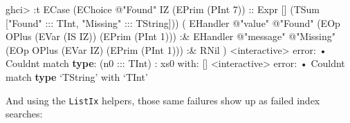 \documentclass[]{article}
\newenvironment{Shaded}{}{}
\newcommand{\DataTypeTok}[1]{\textcolor[rgb]{0.56,0.13,0.00}{#1}}
\newcommand{\DecValTok}[1]{\textcolor[rgb]{0.25,0.63,0.44}{#1}}
\newcommand{\FunctionTok}[1]{\textcolor[rgb]{0.02,0.16,0.49}{#1}}
\newcommand{\KeywordTok}[1]{\textcolor[rgb]{0.00,0.44,0.13}{\textbf{#1}}}
\newcommand{\NormalTok}[1]{#1}
\newcommand{\OperatorTok}[1]{\textcolor[rgb]{0.40,0.40,0.40}{#1}}
\newcommand{\OtherTok}[1]{\textcolor[rgb]{0.00,0.44,0.13}{#1}}
\newcommand{\StringTok}[1]{\textcolor[rgb]{0.25,0.44,0.63}{#1}}
\begin{document}
\begin{Shaded}
\begin{Highlighting}[]
\NormalTok{ghci}\OperatorTok{\textgreater{}} \OperatorTok{:}\NormalTok{t }\DataTypeTok{ECase}
\NormalTok{      (}\DataTypeTok{EChoice} \OperatorTok{@}\StringTok{"Found"} \DataTypeTok{IZ}\NormalTok{ (}\DataTypeTok{EPrim}\NormalTok{ (}\DataTypeTok{PInt} \DecValTok{7}\NormalTok{))}\OtherTok{ ::} \DataTypeTok{Expr}\NormalTok{ \textquotesingle{}[] (}\DataTypeTok{TSum}\NormalTok{ \textquotesingle{}[}\StringTok{"Found"} \OperatorTok{:::} \DataTypeTok{TInt}\NormalTok{, }\StringTok{"Missing"} \OperatorTok{:::} \DataTypeTok{TString}\NormalTok{]))}
\NormalTok{      ( }\DataTypeTok{EHandler} \OperatorTok{@}\StringTok{"value"} \OperatorTok{@}\StringTok{"Found"}\NormalTok{ (}\DataTypeTok{EOp} \DataTypeTok{OPlus}\NormalTok{ (}\DataTypeTok{EVar}\NormalTok{ (}\DataTypeTok{IS} \DataTypeTok{IZ}\NormalTok{)) (}\DataTypeTok{EPrim}\NormalTok{ (}\DataTypeTok{PInt} \DecValTok{1}\NormalTok{)))}
          \OperatorTok{:\&} \DataTypeTok{EHandler} \OperatorTok{@}\StringTok{"message"} \OperatorTok{@}\StringTok{"Missing"}\NormalTok{ (}\DataTypeTok{EOp} \DataTypeTok{OPlus}\NormalTok{ (}\DataTypeTok{EVar} \DataTypeTok{IZ}\NormalTok{) (}\DataTypeTok{EPrim}\NormalTok{ (}\DataTypeTok{PInt} \DecValTok{1}\NormalTok{)))}
          \OperatorTok{:\&} \DataTypeTok{RNil}
\NormalTok{      )}
\OperatorTok{\textless{}}\NormalTok{interactive}\OperatorTok{\textgreater{}} \FunctionTok{error}\OperatorTok{:}
\NormalTok{    • }\DataTypeTok{Couldn\textquotesingle{}t}\NormalTok{ match }\KeywordTok{type}\OperatorTok{:}\NormalTok{ (n0 }\OperatorTok{:::} \DataTypeTok{TInt}\NormalTok{) }\OperatorTok{:}\NormalTok{ xs0}
\NormalTok{                     with}\OperatorTok{:}\NormalTok{ \textquotesingle{}[]}
\OperatorTok{\textless{}}\NormalTok{interactive}\OperatorTok{\textgreater{}} \FunctionTok{error}\OperatorTok{:}
\NormalTok{    • }\DataTypeTok{Couldn\textquotesingle{}t}\NormalTok{ match }\KeywordTok{type}\NormalTok{ ‘}\DataTypeTok{TString}\NormalTok{’ with ‘}\DataTypeTok{TInt}\NormalTok{’}
\end{Highlighting}
\end{Shaded}

And using the \texttt{ListIx} helpers, those same failures show up as failed
index searches:
\end{document}
